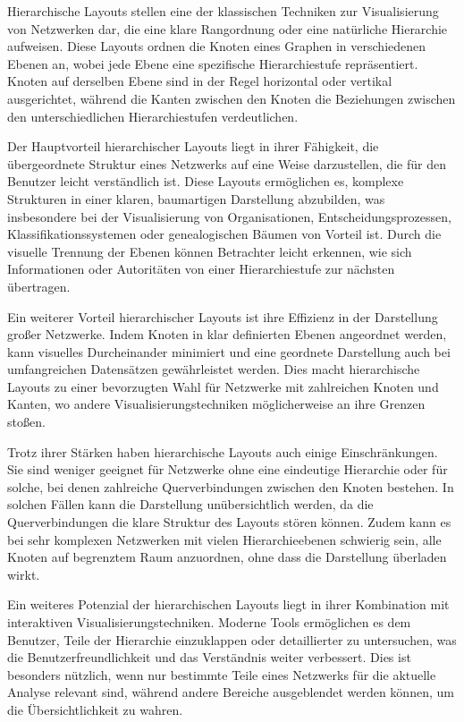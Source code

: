 Hierarchische Layouts stellen eine der klassischen Techniken zur Visualisierung von Netzwerken dar, die eine klare Rangordnung oder eine natürliche Hierarchie aufweisen. Diese Layouts ordnen die Knoten eines Graphen in verschiedenen Ebenen an, wobei jede Ebene eine spezifische Hierarchiestufe repräsentiert. Knoten auf derselben Ebene sind in der Regel horizontal oder vertikal ausgerichtet, während die Kanten zwischen den Knoten die Beziehungen zwischen den unterschiedlichen Hierarchiestufen verdeutlichen.

Der Hauptvorteil hierarchischer Layouts liegt in ihrer Fähigkeit, die übergeordnete Struktur eines Netzwerks auf eine Weise darzustellen, die für den Benutzer leicht verständlich ist. Diese Layouts ermöglichen es, komplexe Strukturen in einer klaren, baumartigen Darstellung abzubilden, was insbesondere bei der Visualisierung von Organisationen, Entscheidungsprozessen, Klassifikationssystemen oder genealogischen Bäumen von Vorteil ist. Durch die visuelle Trennung der Ebenen können Betrachter leicht erkennen, wie sich Informationen oder Autoritäten von einer Hierarchiestufe zur nächsten übertragen.

Ein weiterer Vorteil hierarchischer Layouts ist ihre Effizienz in der Darstellung großer Netzwerke. Indem Knoten in klar definierten Ebenen angeordnet werden, kann visuelles Durcheinander minimiert und eine geordnete Darstellung auch bei umfangreichen Datensätzen gewährleistet werden. Dies macht hierarchische Layouts zu einer bevorzugten Wahl für Netzwerke mit zahlreichen Knoten und Kanten, wo andere Visualisierungstechniken möglicherweise an ihre Grenzen stoßen.

Trotz ihrer Stärken haben hierarchische Layouts auch einige Einschränkungen. Sie sind weniger geeignet für Netzwerke ohne eine eindeutige Hierarchie oder für solche, bei denen zahlreiche Querverbindungen zwischen den Knoten bestehen. In solchen Fällen kann die Darstellung unübersichtlich werden, da die Querverbindungen die klare Struktur des Layouts stören können. Zudem kann es bei sehr komplexen Netzwerken mit vielen Hierarchieebenen schwierig sein, alle Knoten auf begrenztem Raum anzuordnen, ohne dass die Darstellung überladen wirkt.

Ein weiteres Potenzial der hierarchischen Layouts liegt in ihrer Kombination mit interaktiven Visualisierungstechniken. Moderne Tools ermöglichen es dem Benutzer, Teile der Hierarchie einzuklappen oder detaillierter zu untersuchen, was die Benutzerfreundlichkeit und das Verständnis weiter verbessert. Dies ist besonders nützlich, wenn nur bestimmte Teile eines Netzwerks für die aktuelle Analyse relevant sind, während andere Bereiche ausgeblendet werden können, um die Übersichtlichkeit zu wahren.


